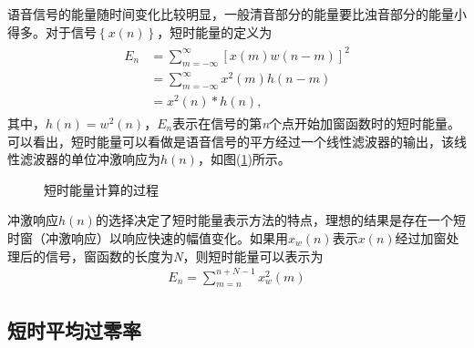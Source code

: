 \documentclass{hitreport}
\begin{document}
语音信号的能量随时间变化比较明显，一般清音部分的能量要比浊音部分的能量小得多。对于信号$\left\{x\left(n\right)\right\}$，短时能量的定义为
\begin{align}
\begin{split}
E_n &= \sum_{m=-\infty}^{\infty}\left[x\left(m\right)w\left(n-m\right)\right]^2\\
&=\sum_{m=-\infty}^{\infty}x^2\left(m\right)h\left(n-m\right)\\
&=x^2\left(n\right)\ast h\left(n\right),
\end{split}
\end{align}
其中，$h\left(n\right) = w^2\left(n\right)$，$E_n$表示在信号的第\textit{n}个点开始加窗函数时的短时能量。可以看出，短时能量可以看做是语音信号的平方经过一个线性滤波器的输出，该线性滤波器的单位冲激响应为$h\left(n\right)$，如图(\ref{fig:energy})所示。
\begin{figure}[htb]
\centering
{}
\caption{短时能量计算的过程}\label{fig:energy}
\end{figure}

冲激响应$h\left(n\right)$的选择决定了短时能量表示方法的特点，理想的结果是存在一个短时窗（冲激响应）以响应快速的幅值变化。如果用$x_w\left(n\right)$表示$x\left(n\right)$经过加窗处理后的信号，窗函数的长度为\textit{N}，则短时能量可以表示为
\begin{align}
E_n = \sum_{m=n}^{n+N-1}x_w^2\left(m\right)
\end{align}

\subsection{短时平均过零率}\label{sec:zero}
\end{document}
